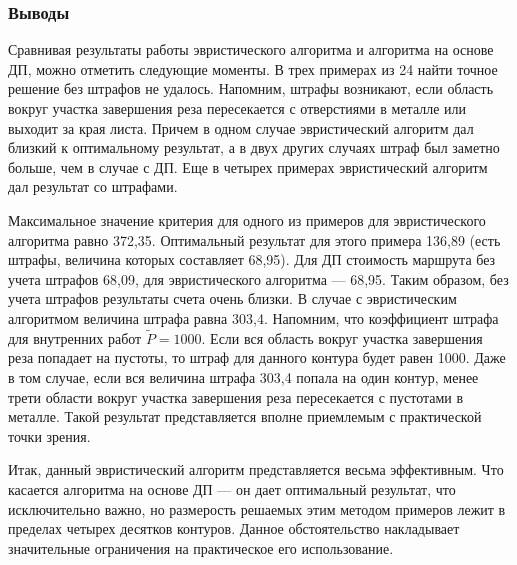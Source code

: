 \subsubsection*{Выводы}

Сравнивая результаты работы эвристического алгоритма и
алгоритма на основе ДП, можно отметить следующие моменты.
В трех примерах из 24 найти точное решение без штрафов не удалось.
Напомним, штрафы возникают,
если область вокруг участка завершения реза пересекается с отверстиями в металле
или выходит за края листа.
Причем в одном случае эвристический алгоритм дал близкий к оптимальному результат,
а в двух других случаях штраф был заметно больше, чем в случае с ДП.
Еще в четырех примерах эвристический алгоритм дал
результат со штрафами.

Максимальное значение критерия для одного из примеров
для эвристического алгоритма равно 372,35.
Оптимальный результат для этого примера 136,89
(есть штрафы, величина которых составляет 68,95).
Для ДП стоимость маршрута без учета штрафов 68,09,
для эвристического алгоритма --- 68,95.
Таким образом, без учета штрафов результаты счета очень близки.
В случае с эвристическим алгоритмом величина штрафа равна 303,4.
Напомним, что коэффициент штрафа для внутренних работ $\tilde{P}=1000$.
Если вся область вокруг участка завершения реза попадает на пустоты,
то штраф для данного контура будет равен 1000.
Даже в том случае, если вся величина штрафа 303,4 попала на один контур,
менее трети области вокруг участка завершения реза пересекается с пустотами в металле.
Такой результат представляется вполне приемлемым с практической точки зрения.

Итак, данный эвристический алгоритм представляется весьма эффективным.
Что касается алгоритма на основе ДП --- он дает оптимальный результат,
что исключительно важно,
но размерость решаемых этим методом примеров лежит в пределах четырех десятков контуров.
Данное обстоятельство накладывает значительные ограничения на практическое его использование.
